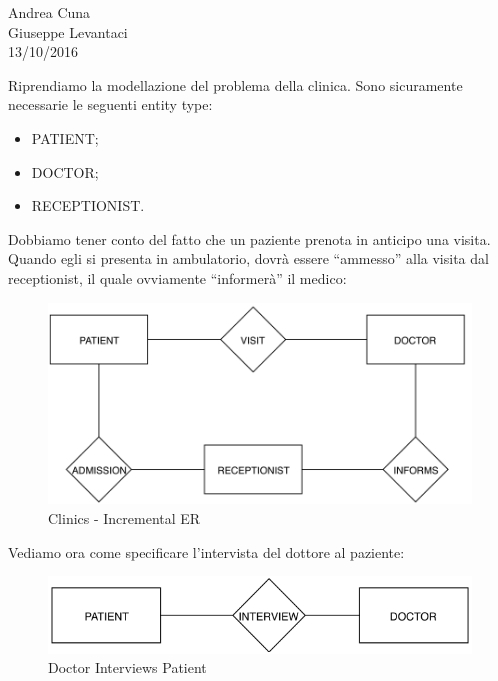 \begin{flushright}Andrea Cuna\\Giuseppe Levantaci\\13/10/2016\end{flushright}

Riprendiamo la modellazione del problema della clinica. Sono sicuramente necessarie le seguenti entity type:

\begin{itemize}

\item PATIENT;
\item DOCTOR;
\item RECEPTIONIST. 

\end{itemize}

Dobbiamo tener conto del fatto che un paziente prenota in anticipo una visita. Quando egli si presenta in ambulatorio, dovrà essere “ammesso” alla visita dal receptionist, il quale ovviamente “informerà” il medico: 

\begin{center}
\begin{figure}[H]
\centering
\includegraphics[scale=1]{figures/clinics_incER.png}
\caption{Clinics - Incremental ER}
\end{figure}
\end{center}

Vediamo ora come specificare l’intervista del dottore al paziente:

\begin{center}
\begin{figure}[H]
\centering
\includegraphics[scale=0.8]{figures/pid.png}
\caption{Doctor Interviews Patient}
\end{figure}
\end{center}

